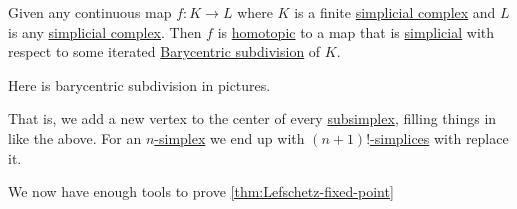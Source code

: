 \begin{theorem}\label{thm:simplicial-approximation-theorem}
	Given any continuous map \(f \colon K \to L\) where \(K\) is a finite \hyperref[def:simplicial-complex]{simplicial complex} and
	\(L\) is any \hyperref[def:simplicial-complex]{simplicial complex}. Then \(f\) is \hyperref[def:homotopic]{homotopic} to a map
	that is \hyperref[def:simplicial-map]{simplicial} with respect to some iterated \hyperref[eg:Barycentric-subdivision]{Barycentric subdivision} of \(K\).
\end{theorem}
\begin{eg}\label{eg:Barycentric-subdivision}
	Here is barycentric subdivision in pictures.
	\begin{figure}[H]
		\centering
		\label{fig:eg:barycentric-subdivision}
	\end{figure}
	That is, we add a new vertex to the center of every \hyperref[def:subsimplex]{subsimplex}, filling things in like the above.
	For an \hyperref[def:standard-simplex]{\(n\)-simplex} we end up with \hyperref[def:standard-simplex]{\((n + 1)!\)-simplices} with replace it.
\end{eg}

We now have enough tools to prove \autoref{thm:Lefschetz-fixed-point}

